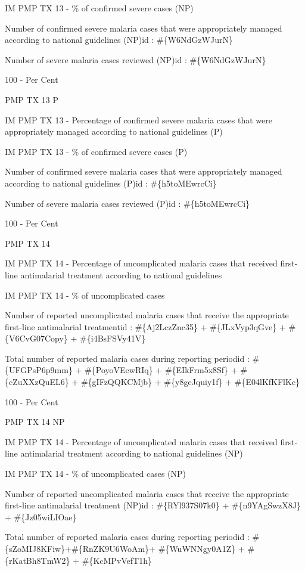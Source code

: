 \documentclass[]{book}
\begin{document}
IM PMP TX 13 - \% of confirmed severe cases (NP)

Number of confirmed severe malaria cases that were appropriately managed according to national guidelines (NP)id : \#\{W6NdGzWJurN\}

Number of severe malaria cases reviewed (NP)id : \#\{W6NdGzWJurN\}

100 - Per Cent

PMP TX 13 P

IM PMP TX 13 - Percentage of confirmed severe malaria cases that were appropriately managed according to national guidelines (P)

IM PMP TX 13 - \% of confirmed severe cases (P)

Number of confirmed severe malaria cases that were appropriately managed according to national guidelines (P)id : \#\{h5toMEwrcCi\}

Number of severe malaria cases reviewed (P)id : \#\{h5toMEwrcCi\}

100 - Per Cent

PMP TX 14

IM PMP TX 14 - Percentage of uncomplicated malaria cases that received first-line antimalarial treatment according to national guidelines

IM PMP TX 14 - \% of uncomplicated cases

Number of reported uncomplicated malaria cases that receive the appropriate first-line antimalarial treatmentid : \#\{Aj2LczZnc35\} + \#\{JLxVyp3qGve\} + \#\{V6CvG07Copy\} + \#\{i4BsFSVy41V\}

Total number of reported malaria cases during reporting periodid : \#\{UFGPsP6p9mm\} + \#\{PoyoVEewRIq\} + \#\{EIkFrm5x8Sf\} + \#\{cZuXXzQuEL6\} + \#\{gIFzQQKCMjb\} + \#\{y8geJquiy1f\} + \#\{E04lKfKFlKc\}

100 - Per Cent

PMP TX 14 NP

IM PMP TX 14 - Percentage of uncomplicated malaria cases that received first-line antimalarial treatment according to national guidelines (NP)

IM PMP TX 14 - \% of uncomplicated cases (NP)

Number of reported uncomplicated malaria cases that receive the appropriate first-line antimalarial treatment (NP)id : \#\{RYl937S07k0\} + \#\{n9YAgSwzX8J\} + \#\{Jz05wiLIOae\}

Total number of reported malaria cases during reporting periodid : \#\{sZoMIJ8KFiw\}+\#\{RnZK9U6WoAm\}+ \#\{WuWNNgy0A1Z\} + \#\{rKatBh8TmW2\} + \#\{KcMPvVefT1h\}
\end{document}
